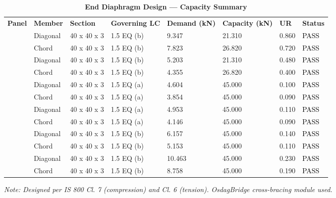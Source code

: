 \documentclass[12pt,a4paper]{report}
\numberwithin{table}{chapter}
\numberwithin{figure}{chapter}
\begin{document}
\vspace{1em}

\begin{longtable}{|C{2.0cm}|L{1.8cm}|C{2.2cm}|C{3.0cm}|C{1.8cm}|C{1.8cm}|C{1.2cm}|C{1.8cm}|}
\caption{\textbf{End Diaphragm Design --- Capacity Summary}} \\
\hline
\endfirsthead
\hline
\caption{\textbf{End Diaphragm Design --- Capacity Summary}} \\
\hline
\endhead
\textbf{Panel} & \textbf{Member} & \textbf{Section} & \textbf{Governing LC} & \textbf{Demand (kN)} & \textbf{Capacity (kN)} & \textbf{UR} & \textbf{Status} \\[6pt]
\hline
{} & Diagonal & 40 x 40 x 3 & 1.5 EQ (b) & 9.347 & 21.310 & 0.860 & \textcolor{black}{PASS} \\[6pt]
 & Chord & 40 x 40 x 3 & 1.5 EQ (b) & 7.823 & 26.820 & 0.720 & \textcolor{black}{PASS} \\[6pt]
\hline
{} & Diagonal & 40 x 40 x 3 & 1.5 EQ (b) & 5.203 & 21.310 & 0.480 & \textcolor{black}{PASS} \\[6pt]
 & Chord & 40 x 40 x 3 & 1.5 EQ (b) & 4.355 & 26.820 & 0.400 & \textcolor{black}{PASS} \\[6pt]
\hline
{} & Diagonal & 40 x 40 x 3 & 1.5 EQ (a) & 4.604 & 45.000 & 0.100 & \textcolor{black}{PASS} \\[6pt]
 & Chord & 40 x 40 x 3 & 1.5 EQ (a) & 3.854 & 45.000 & 0.090 & \textcolor{black}{PASS} \\[6pt]
\hline
{} & Diagonal & 40 x 40 x 3 & 1.5 EQ (a) & 4.953 & 45.000 & 0.110 & \textcolor{black}{PASS} \\[6pt]
 & Chord & 40 x 40 x 3 & 1.5 EQ (a) & 4.146 & 45.000 & 0.090 & \textcolor{black}{PASS} \\[6pt]
\hline
{} & Diagonal & 40 x 40 x 3 & 1.5 EQ (b) & 6.157 & 45.000 & 0.140 & \textcolor{black}{PASS} \\[6pt]
 & Chord & 40 x 40 x 3 & 1.5 EQ (b) & 5.153 & 45.000 & 0.110 & \textcolor{black}{PASS} \\[6pt]
\hline
{} & Diagonal & 40 x 40 x 3 & 1.5 EQ (b) & 10.463 & 45.000 & 0.230 & \textcolor{black}{PASS} \\[6pt]
 & Chord & 40 x 40 x 3 & 1.5 EQ (b) & 8.758 & 45.000 & 0.190 & \textcolor{black}{PASS} \\[6pt]
\hline
\end{longtable}
\noindent\textit{Note: Designed per IS 800 Cl. 7 (compression) and Cl. 6 (tension). OsdagBridge cross-bracing module used.}
\end{document}
